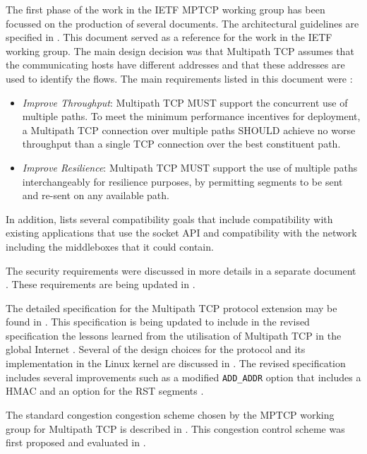 
The first phase of the work in the IETF MPTCP working group has been focussed on the production of several documents. The architectural guidelines are specified in \cite{rfc6182}. This document served as a reference for the work in the IETF working group. The main design decision was that Multipath TCP assumes that the communicating hosts have different addresses and that these addresses are used to identify the flows. The main requirements listed in this document were :
\begin{itemize}

\item \emph{Improve Throughput}: Multipath TCP MUST support the concurrent use of multiple paths.  To meet the minimum performance incentives for deployment, a Multipath TCP connection over multiple paths SHOULD achieve no worse throughput than a single TCP connection over the best constituent path.
\item \emph{Improve Resilience}: Multipath TCP MUST support the use of multiple paths interchangeably for resilience purposes, by permitting segments to be sent and re-sent on any available path. 
\end{itemize}

In addition, \cite{rfc6182} lists several compatibility goals that include compatibility with existing applications that use the socket API and compatibility with the network including the middleboxes that it could contain.

The security requirements were discussed in more details in a separate document \cite{rfc6181}. These requirements are being updated in \cite{draft-ietf-mptcp-attacks}.



The detailed specification for the Multipath TCP protocol extension may be found in \cite{rfc6824}. This specification is being updated to include in the revised specification the lessons learned from the utilisation of Multipath TCP in the global Internet \cite{draft-ietf-mptcp-experience}. Several of the design choices for the protocol and its implementation in the Linux kernel are discussed in \cite{Raiciu_Hard:2012}. The revised specification \cite{draft-ietf-mptcp-rfc6824bis} includes several improvements such as a modified \texttt{ADD\_ADDR} option that includes a HMAC and an option for the RST segments \cite{draft-bonaventure-mptcp-rst}.

The standard congestion congestion scheme chosen by the MPTCP working group for Multipath TCP is described in \cite{rfc6356}. This congestion control scheme was first proposed and evaluated in \cite{Wischik_Design:2011}.

